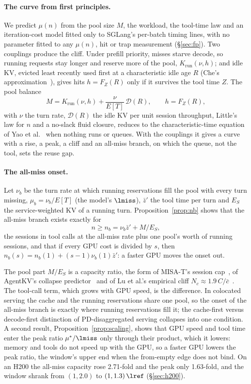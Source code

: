 \paragraph{The curve from first principles.} We predict $\mu(n)$ from the pool size $M$, the workload, the tool-time law and an
iteration-cost model fitted only to SGLang's per-batch timing lines, with no parameter fitted to any $\mu(n)$, hit or trap
measurement (\S\ref{sec:fp}). Two couplings produce the cliff. Under prefill priority, misses starve decode, so running requests
stay longer and reserve more of the pool, $K_{\mathrm{run}}(\nu,h)$; and idle KV, evicted least recently used first at a
characteristic idle age $R$ (Che's approximation~\citep{che2002hierarchical}), gives hits $h=F_Z(R)$ only if it survives the tool
time $Z$. The pool balance
\[
M=K_{\mathrm{run}}(\nu,h)+\frac{\nu}{E[T]}\,\mathcal D(R),\qquad h=F_Z(R),
\]
with $\nu$ the turn rate, $\mathcal D(R)$ the idle KV per unit session throughput, Little's law for $n$ and a no-slack fluid
closure, reduces to the characteristic-time equation of Yao et al.~\citep{yao2026multiturn} when nothing runs or queues. With the
couplings it gives a curve with a rise, a peak, a cliff and an all-miss branch, on which the queue, not the tool, sets the reuse gap.

\paragraph{The all-miss onset.} Let $\nu_b$ be the turn rate at which running reservations fill the pool with every turn
missing, $\mu_b=\nu_b/E[T]$ (the model's $\lmiss$), $\bar z'$ the tool time per turn and $E_S$ the service-weighted KV of a running
turn. Proposition~\ref{prop:nb} shows that the all-miss branch exists exactly for
\[
n\ge n_b=\nu_b\bar z'+M/E_S ,
\]
the sessions in tool calls at the all-miss rate plus one pool's worth of running sessions, and that if every GPU cost is divided by
$s$, then $n_b(s)=n_b(1)+(s-1)\nu_b(1)\bar z'$: a faster GPU moves the onset out.

The pool part $M/E_S$ is a capacity ratio, the form of MISA-T's session cap~\citep{hong2026misat}, of AgentKV's collapse
predictor~\citep{anon2026agentkv} and of Lu et al.'s empirical cliff $N_c\approx1.9\,C/\bar c$~\citep{lu2026cachetrap}. The
tool-call term, which grows with GPU speed, is the difference. In colocated serving the cache and the running reservations share
one pool, so the onset of the all-miss branch is exactly where running reservations fill it; the cache-first versus decode-first
distinction of PD-disaggregated serving collapses into one condition. A second result, Proposition~\ref{prop:scaling}, shows that
GPU speed and tool time enter the peak ratio $\mu^*/\lmiss$ only through their product, which it lowers: memory and tools do not
speed up with the GPU, so a faster GPU lowers the peak ratio, the window's upper end when the from-empty edge does not bind. On an H200 the all-miss capacity rose 2.71-fold and the peak only
1.63-fold, and the window shrank from $(1,2.0)$ to $(1,1.3)\,\lref$ (\S\ref{sec:h200}).

